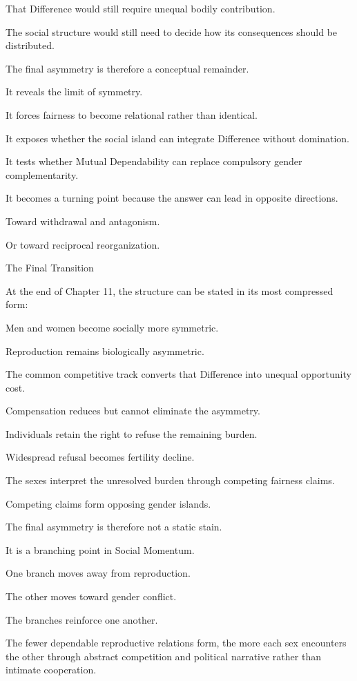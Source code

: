 That Difference would still require unequal bodily contribution.

The social structure would still need to decide how its consequences should be distributed.

The final asymmetry is therefore a conceptual remainder.

It reveals the limit of symmetry.

It forces fairness to become relational rather than identical.

It exposes whether the social island can integrate Difference without domination.

It tests whether Mutual Dependability can replace compulsory gender complementarity.

It becomes a turning point because the answer can lead in opposite directions.

Toward withdrawal and antagonism.

Or toward reciprocal reorganization.

The Final Transition

At the end of Chapter 11, the structure can be stated in its most compressed form:

Men and women become socially more symmetric.

Reproduction remains biologically asymmetric.

The common competitive track converts that Difference into unequal opportunity cost.

Compensation reduces but cannot eliminate the asymmetry.

Individuals retain the right to refuse the remaining burden.

Widespread refusal becomes fertility decline.

The sexes interpret the unresolved burden through competing fairness claims.

Competing claims form opposing gender islands.

The final asymmetry is therefore not a static stain.

It is a branching point in Social Momentum.

One branch moves away from reproduction.

The other moves toward gender conflict.

The branches reinforce one another.

The fewer dependable reproductive relations form, the more each sex encounters the other through abstract competition and political narrative rather than intimate cooperation.

